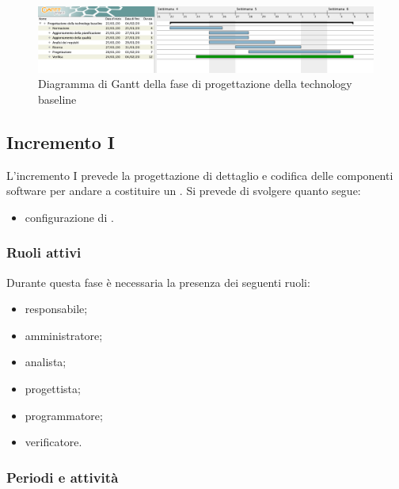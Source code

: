         \begin{landscape}

          \begin{figure}[H]
            \centering
            \includegraphics[width=\linewidth]{images/gantt/progettazioneTechnologyBaseline} %
            \caption{Diagramma di Gantt della fase di progettazione della technology baseline}
          \end{figure}

		\end{landscape}		



		\subsection{Incremento I}
			
			L'incremento I prevede la progettazione di dettaglio e codifica delle componenti software per andare a costituire un . Si prevede di svolgere quanto segue:
			\begin{itemize}
				\item configurazione di .
			\end{itemize}
			
			\subsubsection{Ruoli attivi}
			
				Durante questa fase è necessaria la presenza dei seguenti ruoli:
				\begin{itemize}
					\item responsabile;
					\item amministratore;
					\item analista;
					\item progettista;
					\item programmatore;
					\item verificatore.
				\end{itemize}
			
			\subsubsection{Periodi e attività}
			
